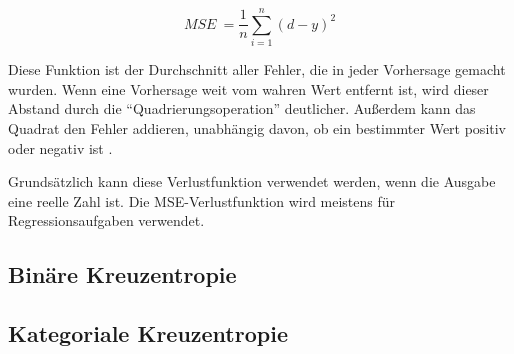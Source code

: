 \begin{equation} \label{Formel2_5}
  MSE\ =\frac{1}{n}{\displaystyle \sum ^{n}_{i=1}( d-y)^2}
\end{equation}

Diese Funktion ist der Durchschnitt aller Fehler, die in jeder Vorhersage gemacht wurden. Wenn eine Vorhersage weit vom wahren Wert entfernt ist, wird dieser Abstand durch die \enquote{Quadrierungsoperation} deutlicher. Außerdem kann das Quadrat den Fehler addieren, unabhängig davon, ob ein bestimmter Wert positiv oder negativ ist \cite*[17]{AntonioGuili;AmitaKapoor;SujitPal2019}.

Grundsätzlich kann diese Verlustfunktion verwendet werden, wenn die Ausgabe eine reelle Zahl ist. Die MSE-Verlustfunktion wird meistens für Regressionsaufgaben verwendet.

\subsection{Binäre Kreuzentropie}
\subsection{Kategoriale Kreuzentropie}








